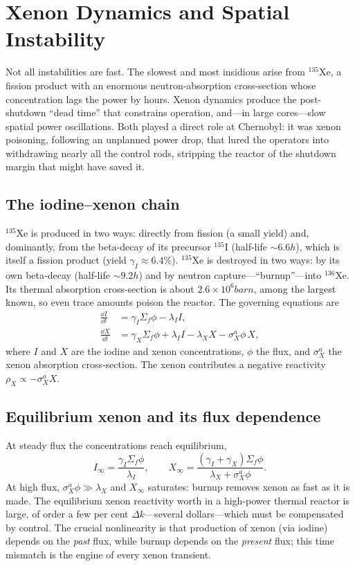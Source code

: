 \chapter{Xenon Dynamics and Spatial Instability}
\label{ch:xenon}

Not all instabilities are fast. The slowest and most insidious arise from
$^{135}$Xe, a fission product with an enormous neutron-absorption cross-section
whose concentration lags the power by hours. Xenon dynamics produce the
post-shutdown ``dead time'' that constrains operation, and---in large cores---slow
spatial power oscillations. Both played a direct role at Chernobyl: it was xenon
poisoning, following an unplanned power drop, that lured the operators into
withdrawing nearly all the control rods, stripping the reactor of the shutdown
margin that might have saved it.

\section{The iodine--xenon chain}

$^{135}$Xe is produced in two ways: directly from fission (a small yield) and,
dominantly, from the beta-decay of its precursor $^{135}$I (half-life
$\sim 6.6\unit{h}$), which is itself a fission product (yield $\gamma_I\approx
6.4\%$). $^{135}$Xe is destroyed in two ways: by its own beta-decay (half-life
$\sim 9.2\unit{h}$) and by neutron capture---``burnup''---into $^{136}$Xe. Its
thermal absorption cross-section is about $2.6\times10^{6}\unit{barn}$, among the
largest known, so even trace amounts poison the reactor. The governing equations
are
\begin{align}
\frac{\dd I}{\dd t} &= \gamma_I \Sigma_f \phi - \lambda_I I,\\
\frac{\dd X}{\dd t} &= \gamma_X \Sigma_f \phi + \lambda_I I
                       - \lambda_X X - \sigma_X^a \phi\, X,
\end{align}
where $I$ and $X$ are the iodine and xenon concentrations, $\phi$ the flux, and
$\sigma_X^a$ the xenon absorption cross-section. The xenon contributes a negative
reactivity $\rho_X \propto -\sigma_X^a X$.

\section{Equilibrium xenon and its flux dependence}

At steady flux the concentrations reach equilibrium,
\begin{equation}
I_\infty = \frac{\gamma_I\Sigma_f\phi}{\lambda_I},\qquad
X_\infty = \frac{(\gamma_I+\gamma_X)\Sigma_f\phi}{\lambda_X + \sigma_X^a\phi}.
\end{equation}
At high flux, $\sigma_X^a\phi \gg \lambda_X$ and $X_\infty$ saturates: burnup
removes xenon as fast as it is made. The equilibrium xenon reactivity worth in a
high-power thermal reactor is large, of order a few per cent $\Delta k$---several
dollars---which must be compensated by control. The crucial nonlinearity is that
production of xenon (via iodine) depends on the \emph{past} flux, while burnup
depends on the \emph{present} flux; this time mismatch is the engine of every
xenon transient.

